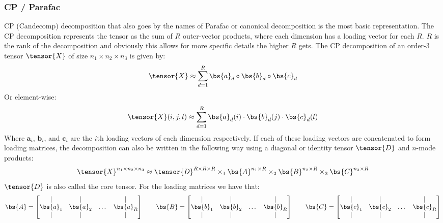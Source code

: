 \subsubsection{CP / Parafac}
CP (Candecomp) decomposition that also goes by the names of Parafac or canonical decomposition is the most basic representation. The CP decomposition represents the tensor as the sum of $R$ outer-vector products, where each dimension has a loading vector for each $R$. $R$ is the rank of the decomposition and obviously this allows for more specific details the higher $R$ gets. The CP decomposition of an order-3 tensor $\tensor{X}$ of size $n_1\times n_2 \times n_3$ is given by:
\begin{equation}
    \tensor{X} \approx \sum_{d=1}^R \bs{a}_d \circ \bs{b}_d \circ \bs{c}_d
\end{equation}
Or element-wise:
\begin{equation}
    \tensor{X}(i, j, l) \approx \sum_{d=1}^R \bs{a}_d(i) \cdot \bs{b}_d(j) \cdot \bs{c}_d(l)
\end{equation}
Where $\boldsymbol{a}_i$, $\boldsymbol{b}_i$, and $\boldsymbol{c}_i$ are the $i$th loading vectors of each dimension respectively. If each of these loading vectors are concatenated to form loading matrices, the decomposition can also be written in the following way using a diagonal or identity tensor $\tensor{D}$ and $n$-mode products:
\begin{equation}
    \tensor{X}^{n_1 \times n_2 \times n_3} \approx \tensor{D}^{R\times R\times R} \times_1 \bs{A}^{n_1 \times R} \times_2 \bs{B}^{n_2 \times R} \times_3 \bs{C}^{n_3 \times R}
    \label{eq:CP_matrix_rep}
\end{equation}
$\tensor{D}$ is also called the core tensor. For the loading matrices we have that:
\begin{equation}
    \bs{A} = \begin{bmatrix} | & | & & |\\ \bs{a}_1 & \bs{a}_2 & \dots & \bs{a}_R \\ | & | & & | \end{bmatrix} \qquad \bs{B} = \begin{bmatrix} | & | & & |\\ \bs{b}_1 & \bs{b}_2 & \dots & \bs{b}_R \\ | & | & & | \end{bmatrix} \qquad \bs{C} = \begin{bmatrix} | & | & & |\\ \bs{c}_1 & \bs{c}_2 & \dots & \bs{c}_R \\ | & | & & | \end{bmatrix}
\end{equation}
